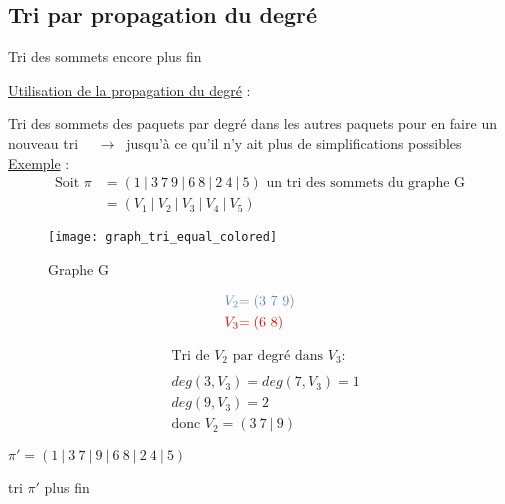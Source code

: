 \subsection{Tri par propagation du degré}
\begin{frame}{Tri des sommets encore plus fin}
    \begin{center}
        \underline{Utilisation de la propagation du degré} :
    \end{center}
    Tri des sommets des paquets par degré dans les autres paquets pour en faire un nouveau tri \newline
    $\quad \rightarrow \ $ jusqu'à ce qu'il n'y ait plus de simplifications possibles \newline \newline
    \underline{Exemple} :
    \begin{align*}
        \text{Soit } \pi &= (1\ |\ 3\ 7\ 9\ |\ 6\ 8\ |\ 2\ 4\ |\ 5) \text{ un tri des sommets du graphe G} \\
        &= (V_1\ |\ V_2\ |\ V_3 \ | \ V_4\ |\ V_5)
    \end{align*} 
    \begin{minipage}{0.3\textwidth}
        \begin{figure}
        \texttt{[image: graph\_tri\_equal\_colored]} 
        \caption{\label{fig:graphe_tri_equal}Graphe G}
        \end{figure}
    \end{minipage}
    \begin{minipage}{0.25\textwidth}
        \begin{align*}
            \textcolor{airforceblue}{V_2} & \textcolor{airforceblue}{=(3 \ 7\ 9)} \\
            \textcolor{red}{V_3}  & \textcolor{red}{=(6\ 8)}
        \end{align*}
    \end{minipage} 
    \begin{minipage}{0.4\textwidth}
        \begin{align*}
        & \text{Tri de } V_2 \text{ par degré dans } V_3 : \\ \\
        & deg(3,V_3)=deg(7,V_3)=1 \\
        & deg(9,V_3)=2 \\
        & \text{donc } V_2 = (3\ 7\ |\ 9)
        \end{align*}
        \begin{center}
            $\pi ' = (1\ |\ 3\ 7\ |\ 9\ |\ 6\ 8\ |\ 2\ 4\ |\ 5)$
        \end{center}
    \end{minipage}
    \begin{center}
    tri $\pi'$ plus fin
    \end{center}
\end{frame}

